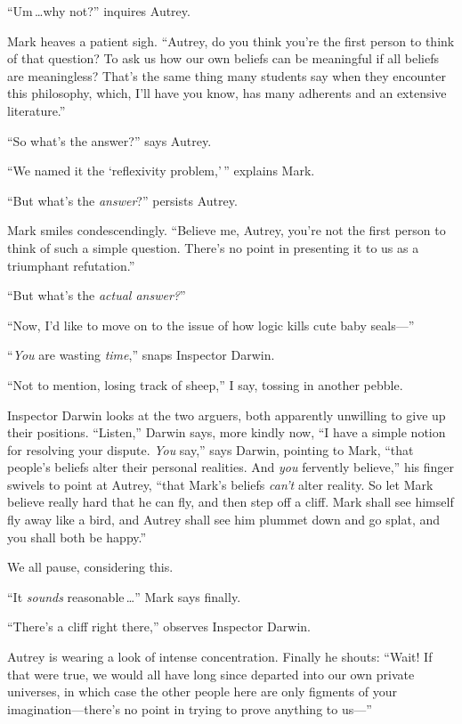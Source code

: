 {
 ``Um\,\ldots why not?'' inquires
Autrey.}

{
 Mark heaves a patient sigh. ``Autrey, do you
think you're the first person to think of that
question? To ask us how our own beliefs can be meaningful if all
beliefs are meaningless? That's the same thing many
students say when they encounter this philosophy, which,
I'll have you know, has many adherents and an extensive
literature.''}

{
 ``So what's the
answer?'' says Autrey.}

{
 ``We named it the `reflexivity
problem,'\,'' explains Mark.}

{
 ``But what's the
\textit{answer}?'' persists Autrey.}

{
 Mark smiles condescendingly. ``Believe me,
Autrey, you're not the first person to think of such a
simple question. There's no point in presenting it to
us as a triumphant refutation.''}

{
 ``But what's the \textit{actual
answer?}''}

{
 ``Now, I'd like to move on to the
issue of how logic kills cute baby seals---''}

{
 ``\textit{You} are wasting
\textit{time},'' snaps Inspector Darwin.}

{
 ``Not to mention, losing track of
sheep,'' I say, tossing in another pebble.}

{
 Inspector Darwin looks at the two arguers, both apparently
unwilling to give up their positions.
``Listen,'' Darwin says, more kindly
now, ``I have a simple notion for resolving your
dispute. \textit{You} say,'' says Darwin, pointing to
Mark, ``that people's beliefs alter
their personal realities. And \textit{you} fervently
believe,'' his finger swivels to point at Autrey,
``that Mark's beliefs
\textit{can't} alter reality. So let Mark believe
really hard that he can fly, and then step off a cliff. Mark shall see
himself fly away like a bird, and Autrey shall see him plummet down and
go splat, and you shall both be happy.''}

{
 We all pause, considering this.}

{
 ``It \textit{sounds} reasonable\,\ldots'' Mark says finally.}

{
 ``There's a cliff right
there,'' observes Inspector Darwin.}

{
 Autrey is wearing a look of intense concentration. Finally he
shouts: ``Wait! If that were true, we would all have
long since departed into our own private universes, in which case the
other people here are only figments of your
imagination---there's no point in trying to prove
anything to us---''}

